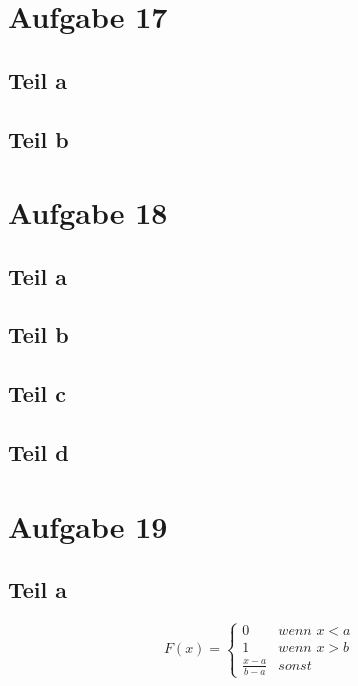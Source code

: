 \documentclass[10pt,a4paper]{article}
\begin{document}
\section{Aufgabe 17}

\subsection{Teil a}

\subsection{Teil b}

\section{Aufgabe 18}

\subsection{Teil a}

\subsection{Teil b}

\subsection{Teil c}

\subsection{Teil d}

\section{Aufgabe 19}

\subsection{Teil a}
\begin{equation}
  F(x) = 
  \begin{cases}
    0 & \textit{wenn $x < a$}\\
    1 & \textit{wenn $x > b$}\\
    \frac{x - a}{b - a} & \textit{sonst}
  \end{cases}
\end{equation}
\end{document}

